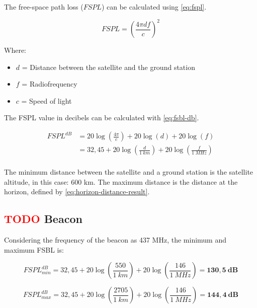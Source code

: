 The free-space path loss ($FSPL$) can be calculated using \autoref{eq:fspl}.

\begin{equation} \label{eq:fspl}
FSPL = \left( \frac{4\pi d f}{c} \right)^{2}
\end{equation}

Where:

\begin{itemize}
    \item $d$ = Distance between the satellite and the ground station
    \item $f$ = Radiofrequency
    \item $c$ = Speed of light
\end{itemize}

The FSPL value in decibels can be calculated with \autoref{eq:fsbl-db}.

\begin{equation} \label{eq:fsbl-db}
    \begin{split}
        FSPL^{dB} & = 20\log\left(\frac{4\pi}{c}\right) + 20\log\left(d\right) + 20\log\left(f\right) \\
                  & = 32,45 + 20\log\left(\frac{d}{1\ km}\right) + 20\log\left(\frac{f}{1\ MHz}\right) \\
    \end{split}
\end{equation}

The minimum distance between the satellite and a ground station is the satellite altitude, in this case: 600 km. The maximum distance is the distance at the horizon, defined by \autoref{eq:horizon-distance-result}.

\subsection{ \textcolor{red}{TODO} Beacon}

Considering the frequency of the beacon as 437 MHz, the minimum and maximum FSBL is:

\begin{equation}
    FSPL^{dB}_{min} = 32,45 + 20\log\left(\frac{550}{1\ km}\right) + 20\log\left(\frac{146}{1\ MHz}\right) = \mathbf{130,5\ dB}
\end{equation}

\begin{equation}
    FSPL^{dB}_{max} = 32,45 + 20\log\left(\frac{2705}{1\ km}\right) + 20\log\left(\frac{146}{1\ MHz}\right) = \mathbf{144,4\ dB}
\end{equation}

